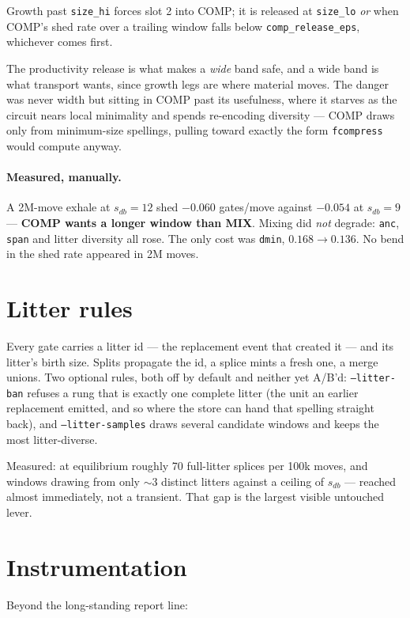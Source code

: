 \documentclass[11pt]{article}
\begin{document}
Growth past \texttt{size_hi} forces slot 2 into COMP; it is released at
\texttt{size_lo} \emph{or} when COMP's shed rate over a trailing window falls
below \texttt{comp_release_eps}, whichever comes first.

The productivity release is what makes a \emph{wide} band safe, and a wide band
is what transport wants, since growth legs are where material moves. The danger
was never width but sitting in COMP past its usefulness, where it starves as the
circuit nears local minimality and spends re-encoding diversity --- COMP draws
only from minimum-size spellings, pulling toward exactly the form
\texttt{fcompress} would compute anyway.

\paragraph{Measured, manually.} A 2M-move exhale at $s_{db}=12$ shed
$-0.060$ gates/move against $-0.054$ at $s_{db}=9$ --- \textbf{COMP wants a
longer window than MIX}. Mixing did \emph{not} degrade: \texttt{anc},
\texttt{span} and litter diversity all rose. The only cost was \texttt{dmin},
$0.168 \to 0.136$. No bend in the shed rate appeared in 2M moves.

\section{Litter rules}

Every gate carries a litter id --- the replacement event that created it --- and
its litter's birth size. Splits propagate the id, a splice mints a fresh one, a
merge unions. Two optional rules, both off by default and neither yet A/B'd:
\texttt{--litter-ban} refuses a rung that is exactly one complete litter (the
unit an earlier replacement emitted, and so where the store can hand that
spelling straight back), and \texttt{--litter-samples} draws several candidate
windows and keeps the most litter-diverse.

Measured: at equilibrium roughly 70 full-litter splices per 100k moves, and
windows drawing from only $\sim$3 distinct litters against a ceiling of $s_{db}$
--- reached almost immediately, not a transient. That gap is the largest visible
untouched lever.

\section{Instrumentation}

Beyond the long-standing report line:
\end{document}
